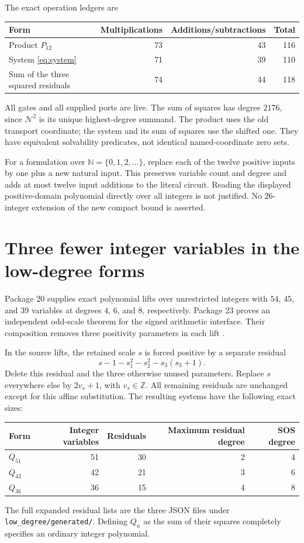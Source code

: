 \documentclass[11pt]{article}
\theoremstyle{remark}\newtheorem{remark}[theorem]{Remark}
\newcommand{\Z}{\mathbb Z}\newcommand{\N}{\mathbb N}
\begin{document}
The exact operation ledgers are
\begin{center}
\begin{tabular}{@{}lrrr@{}}\toprule
Form & Multiplications & Additions/subtractions & Total\\\midrule
Product $P_{12}$ &73&43&116\\
System \eqref{eq:system} &71&39&110\\
Sum of the three squared residuals &74&44&118\\\bottomrule
\end{tabular}
\end{center}
All gates and all supplied ports are live. The sum of squares has degree
$2176$, since $\mathcal N^2$ is its unique highest-degree summand.
The product uses the old transport coordinate; the system and its sum of
squares use the shifted one. They have equivalent solvability predicates,
not identical named-coordinate zero sets.

For a formulation over $\N=\{0,1,2,\ldots\}$, replace each of the
twelve positive inputs by one plus a new natural input. This preserves
variable count and degree and adds at most twelve input additions to the
literal circuit. Reading the displayed positive-domain polynomial directly
over all integers is not justified. No $26$-integer extension of the new
compact bound is asserted.



\section{Three fewer integer variables in the low-degree forms}
\label{sec:lowdegree}

Package 20 supplies exact polynomial lifts over unrestricted integers with
$54$, $45$, and $39$ variables at degrees $4$, $6$, and $8$, respectively.
Package 23 proves an independent odd-scale theorem for the signed arithmetic
interface. Their composition removes three positivity parameters in each
lift \cite{root12,separating12}.

In the source lifts, the retained scale $s$ is forced positive by a separate
residual
\[
 s-1-s_1^2-s_2^2-s_3(s_3+1).
\]
Delete this residual and the three otherwise unused parameters. Replace
$s$ everywhere else by $2v_s+1$, with $v_s\in\Z$. All remaining residuals
are unchanged except for this affine substitution. The resulting systems
have the following exact sizes:
\begin{center}
\begin{tabular}{@{}lrrrr@{}}\toprule
Form&Integer variables&Residuals&Maximum residual degree&SOS degree\\\midrule
$Q_{51}$&51&30&2&4\\
$Q_{42}$&42&21&3&6\\
$Q_{36}$&36&15&4&8\\\bottomrule
\end{tabular}
\end{center}
The full expanded residual lists are the three JSON files under
\texttt{low\_degree/generated/}. Defining $Q_n$ as the sum of their
squares completely specifies an ordinary integer polynomial.
\end{document}
